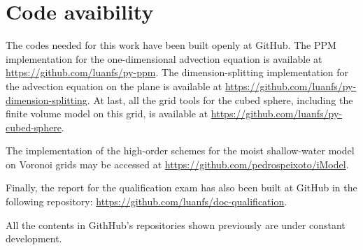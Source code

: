 \chapter{Code avaibility}
\label{anexo-code}

The codes needed for this work have been built openly at GitHub. 
The PPM implementation for the one-dimensional advection equation is available 
at \url{https://github.com/luanfs/py-ppm}.
The dimension-splitting implementation for the advection equation on the plane 
is available at \url{https://github.com/luanfs/py-dimension-splitting}.
At last, all the grid tools for the cubed sphere, including the finite volume
model on this grid, is available at \url{https://github.com/luanfs/py-cubed-sphere}.

The implementation of the high-order schemes for the moist shallow-water model
on Voronoi grids may be accessed at
\url{https://github.com/pedrospeixoto/iModel}.

Finally, the report for the qualification exam has also been built at  GitHub in the following  repository:
\url{https://github.com/luanfs/doc-qualification}.

All the contents in GithHub's repositories shown previously are under constant development.

